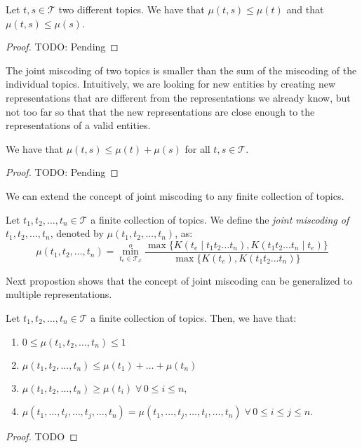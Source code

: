 \begin{proposition}
Let $t, s \in \mathcal{T}$ two different topics. We have that $\mu(t,s) \leq \mu(t)$ and that $\mu(t,s) \leq \mu(s)$.
\end{proposition}
\begin{proof}
{\color{red} TODO: Pending}
\end{proof}

The joint miscoding of two topics is smaller than the sum of the miscoding of the individual topics. Intuitively, we are looking for new entities by creating new representations that are different from the representations we already know, but not too far so that that the new representations are close enough to the representations of a valid entities.

\begin{proposition}
We have that $\mu(t,s) \leq \mu(t) + \mu(s)$ for all $t, s \in \mathcal{T}$.
\end{proposition}
\begin{proof}
{\color{red} TODO: Pending}
\end{proof}

We can extend the concept of joint miscoding to any finite collection of topics.

\begin{definition}
Let $t_1, t_2, \ldots, t_n \in \mathcal{T}$ a finite collection of topics. We define the \emph{joint miscoding of} $t_1, t_2, \ldots, t_n$, denoted by $\mu(t_1, t_2, \ldots, t_n)$, as:
\[
\mu(t_1, t_2, \ldots, t_n) = \overset{o}{ \underset{t_e \in \mathcal{T}_\mathcal{E}} \min} \frac{ \max\{ K(t_e \mid t_1 t_2 \ldots t_n), K(t_1 t_2 \ldots t_n \mid t_e) \} } { \max\{ K(t_e), K(t_1 t_2 \ldots t_n) \} }
\]
\end{definition}

Next propostion shows that the concept of joint miscoding can be generalized to multiple representations.

\begin{proposition}
Let $t_1, t_2, \ldots, t_n \in \mathcal{T}$ a finite collection of topics. Then, we have that:

\renewcommand{\theenumi}{\roman{enumi}}
\begin{enumerate}
\item $0 \leq \mu(t_1, t_2, \ldots, t_n) \leq 1$
\item $\mu(t_1, t_2, \ldots, t_n) \leq \mu(t_1) + \ldots + \mu(t_n)$
\item $\mu(t_1, t_2, \ldots, t_n) \geq \mu(t_i) \; \forall \, 0 \leq i \leq n$,
\item $\mu(t_1, \ldots, t_i, \ldots, t_j, \ldots, t_n) = \mu(t_1, \ldots, t_j, \ldots, t_i, \ldots, t_n) \; \forall \, 0 \leq i \leq j \leq n$.
\end{enumerate}
\end{proposition}
\begin{proof}
{\color{red} TODO}
\end{proof}

